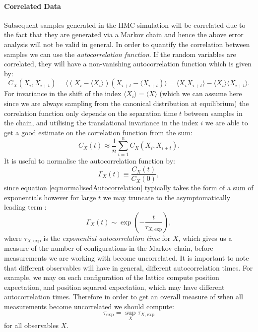 \documentclass[12pt]{article}
\begin{document}
            \paragraph{Correlated Data} Subsequent samples generated in the HMC simulation will be correlated due to the fact that they are generated via a Markov chain and hence the above error analysis will not be valid in general. In order to quantify the correlation between samples we can use the \textit{autocorrelation function}. If the random variables are correlated, they will have a non-vanishing autocorrelation function which is given by:
            \begin{equation}
                \label{eq:autocorrelationfunction}
                C_{X}\left(X_i,X_{i+t}\right) = \langle \left(X_i-\langle X_i\rangle\right)\left(X_{i+t}-\langle X_{i+t}\right)\rangle = \langle X_iX_{i+t}\rangle - \langle X_i \rangle \langle X_{i+t} \rangle.
            \end{equation}
            For invariance in the shift of the index $\langle X_i \rangle = \langle X \rangle$ (which we can assume here since we are always sampling from the canonical distribution at equilibrium) the correlation function only depends on the separation time $t$ between samples in the chain, and utilising the translational invariance in the index $i$ we are able to get a good estimate on the correlation function from the sum:
            \begin{equation}
                C_{X}\left(t\right) \approx \frac{1}{n}\sum_{i=1}^nC_X\left(X_i,X_{i+t}\right).
            \end{equation}
            It is useful to normalise the autocorrelation function by:
            \begin{equation}
                \label{eq:normalisedAutocorrelation}
                \Gamma_{X}\left(t\right) \equiv \frac{C_X\left(t\right)}{C_X\left(0\right)},
            \end{equation}
            since equation \ref{eq:normalisedAutocorrelation} typically takes the form of a sum of exponentials however for  large $t$  we may truncate to the asymptomatically leading term \cite{gattringer_lang_2013}:
            \begin{equation}
                \Gamma_{X}\left(t\right)\sim\exp\left(-\frac{t}{\tau_{X,\text{exp}}}\right),
            \end{equation}
            where $\tau_{X,\text{exp}}$ is the \textit{exponential autocorrelation time} for $X$, which gives us a measure of the number of configurations in the Markov chain, before measurements we are working with become uncorrelated. It is important to note that different observables will have in general, different autocorrelation times. For example, we may on each configuration of the lattice compute position expectation, and position squared expectation, which may have different autocorrelation times. Therefore in order to get an overall measure of when all measurements become uncorrelated we should compute:
            \begin{equation}
                \tau_{\text{exp}}=\sup_{X} \tau_{X,\text{exp}}
            \end{equation}
            for all observables $X$.
\end{document}
